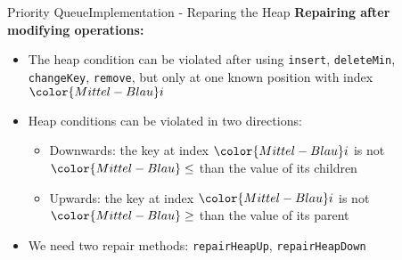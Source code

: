 \begin{frame}{Priority Queue}{Implementation - Reparing the Heap}
  \textbf{Repairing after modifying operations:}
  \begin{itemize}
    \item<2->
      The heap condition can be violated after using
      {\color{Mittel-Blau}\texttt{insert}},
      {\color{Mittel-Blau}\texttt{deleteMin}},
      {\color{Mittel-Blau}\texttt{changeKey}},
      {\color{Mittel-Blau}\texttt{remove}},
      but only at one known position with index ${\color{Mittel-Blau}i}$
    \item<3->
      Heap conditions can be violated in two directions:
      \begin{itemize}
        \item<4->
          Downwards:
          the key at index ${\color{Mittel-Blau}i}$ is not
          ${\color{Mittel-Blau}\leq}$ than the value of its children
        \item<5->
          Upwards:
          the key at index ${\color{Mittel-Blau}i}$ is not
          ${\color{Mittel-Blau}\geq}$ than the value of its parent
      \end{itemize}
    \item<6->
      We need two repair methods:
      {\color{Mittel-Blau}\texttt{repairHeapUp}},
      {\color{Mittel-Blau}\texttt{repairHeapDown}}
  \end{itemize}
\end{frame}


